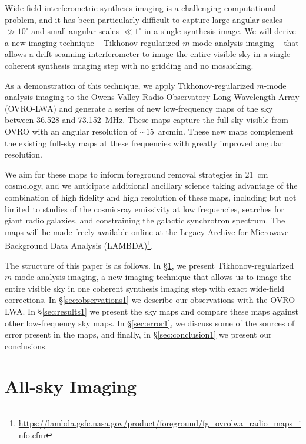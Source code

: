 \begin{bibunit}
Wide-field interferometric synthesis imaging is a challenging computational problem, and it has been
particularly difficult to capture large angular scales $\gg 10^\circ$ and small angular scales $\ll
1^\circ$ in a single synthesis image. We will derive a new imaging technique -- Tikhonov-regularized
$m$-mode analysis imaging -- that allows a drift-scanning interferometer to image the entire visible
sky in a single coherent synthesis imaging step with no gridding and no mosaicking.

As a demonstration of this technique, we apply Tikhonov-regularized $m$-mode analysis imaging to the
Owens Valley Radio Observatory Long Wavelength Array (OVRO-LWA) and generate a series of new
low-frequency maps of the sky between 36.528 and 73.152~MHz.  These maps capture the full sky
visible from OVRO with an angular resolution of $\sim 15$~arcmin.  These new maps complement the
existing full-sky maps at these frequencies with greatly improved angular resolution.

We aim for these maps to inform foreground removal strategies in 21~cm cosmology, and we anticipate
additional ancillary science taking advantage of the combination of high fidelity and high
resolution of these maps, including but not limited to studies of the cosmic-ray emissivity at low
frequencies, searches for giant radio galaxies, and constraining the galactic synchrotron spectrum.
The maps will be made freely available online at the Legacy Archive for Microwave Background Data
Analysis (LAMBDA)\footnote{
    \url{https://lambda.gsfc.nasa.gov/product/foreground/fg_ovrolwa_radio_maps_info.cfm}
}.

The structure of this paper is as follows. In \S\ref{sec:imaging}, we present Tikhonov-regularized
$m$-mode analysis imaging, a new imaging technique that allows us to image the entire visible sky in
one coherent synthesis imaging step with exact wide-field corrections. In \S\ref{sec:observations1}
we describe our observations with the OVRO-LWA. In \S\ref{sec:results1} we present the sky maps and
compare these maps against other low-frequency sky maps.  In \S\ref{sec:error1}, we discuss some of
the sources of error present in the maps, and finally, in \S\ref{sec:conclusion1} we present our
conclusions.

\section{All-sky Imaging}\label{sec:imaging}


\end{bibunit}
